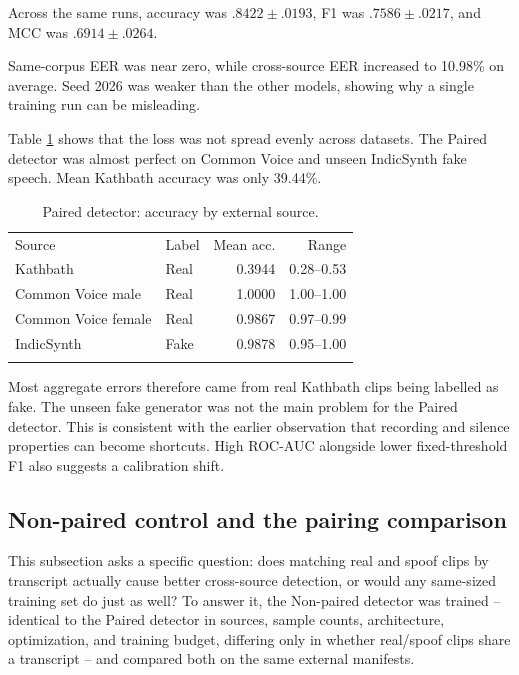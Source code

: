\documentclass[3p,times,procedia]{elsarticle}
\begin{document}
Across the same runs, accuracy was $.8422\pm.0193$, F1 was
$.7586\pm.0217$, and MCC was $.6914\pm.0264$.

Same-corpus EER was near zero, while cross-source EER increased to 10.98\%
on average. Seed 2026 was weaker than the other models, showing why a single
training run can be misleading.

Table \ref{tab:source} shows that the loss was not spread evenly across
datasets. The Paired detector was almost perfect on Common Voice and unseen
IndicSynth fake speech. Mean Kathbath accuracy was only 39.44\%.

\begin{table}[h]
\caption{Paired detector: accuracy by external source.}
\label{tab:source}
\begin{tabular*}{\hsize}{@{\extracolsep{\fill}}llrr@{}}
\toprule
Source & Label & Mean acc. & Range \\
\colrule
Kathbath & Real & 0.3944 & 0.28--0.53 \\
Common Voice male & Real & 1.0000 & 1.00--1.00 \\
Common Voice female & Real & 0.9867 & 0.97--0.99 \\
IndicSynth & Fake & 0.9878 & 0.95--1.00 \\
\botrule
\end{tabular*}
\end{table}

Most aggregate errors therefore came from real Kathbath clips being labelled
as fake. The unseen fake generator was not the main problem for the Paired
detector. This is consistent with the earlier observation that recording and
silence properties can become shortcuts. High ROC-AUC alongside lower
fixed-threshold F1 also suggests a calibration shift.

\subsection{Non-paired control and the pairing comparison}
\label{sec:pairing-comparison}
This subsection asks a specific question: does matching real and spoof
clips by transcript actually cause better cross-source detection, or would
any same-sized training set do just as well? To answer it, the
Non-paired detector was trained -- identical to the Paired detector in sources, sample
counts, architecture, optimization, and training budget, differing only in
whether real/spoof clips share a transcript -- and compared both on the
same external manifests.
\end{document}
